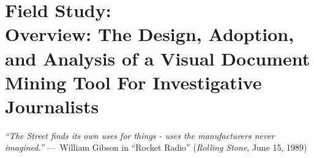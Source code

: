 
\chapter[Field Study\texorpdfstring{:\\ Overview: The Design, Adoption, and Analysis of a Visual Document Mining Tool For Investigative Journalists}{}]{Field Study\texorpdfstring{:\\ \large{Overview: The Design, Adoption, and Analysis of a Visual Document Mining Tool For Investigative Journalists}}{}}
\label{ch:overview}




\begin{epigraph}
    \emph{``The Street finds its own uses for things - uses the manufacturers never imagined.''} ---~William Gibson in ``Rocket Radio'' (\emph{Rolling Stone}, June 15, 1989)
\end{epigraph}

